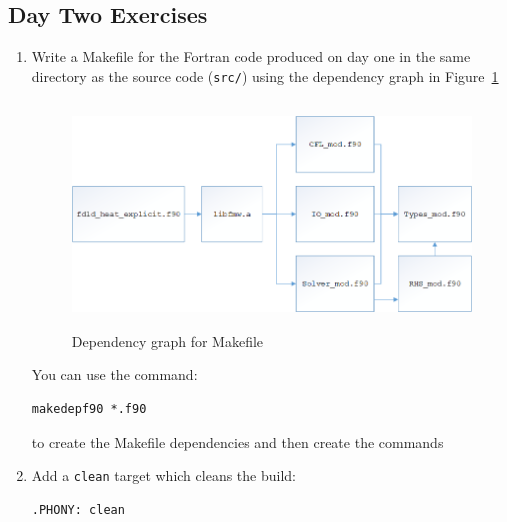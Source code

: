 \documentclass[12pt]{article}
\begin{document}
\subsection*{Day Two Exercises}
\begin{enumerate}
\item Write a Makefile for the Fortran code produced on day one in the same directory as the source
  code (\texttt{src/}) using the dependency graph in Figure~\ref{make_depend:eps}
\begin{figure}[H]
\begin{center}
\includegraphics[height=6cm]{make_depend.png}
\caption{Dependency graph for Makefile}
\label{make_depend:eps}
\end{center}
\end{figure}
You can use the command:
\begin{verbatim}
makedepf90 *.f90
\end{verbatim}
to create the Makefile dependencies and then create the commands
\item Add a \texttt{clean} target which cleans the build:
\begin{verbatim}
.PHONY: clean


\end{verbatim}
\end{enumerate}
\end{document}

